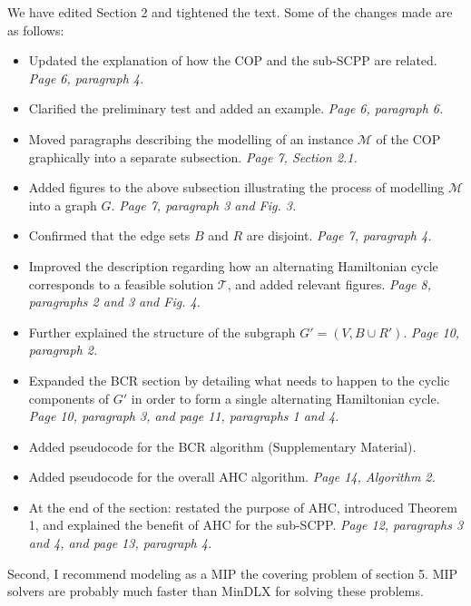 \documentclass[a4paper,11pt]{article}
\newcommand{\cmsa}[1]{{\color{myGreen}#1}}
\newcommand{\resp}[1]{{\color{myDarkBlue2}#1}} %
\begin{document}
\resp{We have edited Section 2 and tightened the text. Some of the changes made are as follows:
\begin{itemize}[itemsep=-0.4em, leftmargin=*]
	\item Updated the explanation of how the COP and the sub-SCPP are related. \textit{Page 6, paragraph 4.}
	\item Clarified the preliminary test and added an example. \textit{Page 6, paragraph 6.}
	\item Moved paragraphs describing the modelling of an instance $\mathcal{M}$ of the COP graphically into a separate subsection. \textit{Page 7, Section 2.1.}
	\item Added figures to the above subsection illustrating the process of modelling $\mathcal{M}$ into a graph $G$. \textit{Page 7, paragraph 3 and Fig. 3.}
	\item Confirmed that the edge sets $B$ and $R$ are disjoint. \textit{Page 7, paragraph 4.}
	\item Improved the description regarding how an alternating Hamiltonian cycle corresponds to a feasible solution $\mathcal{T}$, and added relevant figures. \textit{Page 8, paragraphs 2 and 3 and Fig. 4.}
	\item Further explained the structure of the subgraph $G'=(V, B \cup R')$. \textit{Page 10, paragraph 2.}
	\item Expanded the BCR section by detailing what needs to happen to the cyclic components of $G'$ in order to form a single alternating Hamiltonian cycle. \textit{Page 10, paragraph 3, and page 11, paragraphs 1 and 4.}
	\item Added pseudocode for the BCR algorithm (Supplementary Material).
	\item Added pseudocode for the overall AHC algorithm. \textit{Page 14, Algorithm 2.}
	\item At the end of the section: restated the purpose of AHC, introduced Theorem 1, and explained the benefit of AHC for the sub-SCPP. \textit{Page 12, paragraphs 3 and 4, and page 13, paragraph 4.}
\end{itemize}
}


Second, I recommend modeling as a MIP the covering problem of section 5. MIP solvers are probably much faster than MinDLX for solving these problems. 

\end{document}
